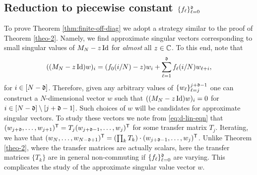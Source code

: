 \documentclass{amsart}
\numberwithin{equation}{section}
\def\corABrev{\textcolor{black}}
\newcommand{\abbr}[1]{{\sc\lowercase{#1}}}
\begin{document}



\subsection{Reduction to piecewise constant $\{f_\ell\}_{\ell=0}^{\mathfrak{d}}$}
To prove Theorem \ref{thm:finite-off-diag} we adopt a strategy similar
to the proof of Theorem \ref{theo-2}. Namely, we find approximate singular vectors corresponding to small singular values of $M_N - z \operatorname{Id}$ for {\em almost} all $z \in \mathbb{C}$. To this end, note that
\begin{equation}\label{eq:d-lin-eqn}
((M_N-z\Id) w)_i = (\corABrev{f_0(i/N)}-z) w_i + \sum_{\ell=1}^{\gd} \corABrev{f_\ell(i/N)} w_{\ell+i},
\end{equation}
for $i \in [N-\mathfrak{d}]$.
Therefore, given any arbitrary values of
$\{w_\ell\}_{\ell=j}^{j+\mathfrak{d}-1}$ one
can construct a $N$-dimensional vector
$w$ such that $((M_N-z\operatorname{Id}) w)_i = 0$ for $i \in[N-\mathfrak{d}]\setminus[j+\mathfrak{d}-1]$.
Such choices of $w$ will be candidates for approximate singular vectors.
To study these vectors we note from \eqref{eq:d-lin-eqn} that
$(w_{j+\mathfrak{d}}, \ldots,w_{j+1})^{\mathsf{T}}= T_j (w_{j+\mathfrak{d} -1},
\ldots,w_j)^{\mathsf{T}}$ for some transfer matrix $T_j$.
Iterating, we have that
$(w_{N}, \ldots,w_{N-\mathfrak{d}+1})^{\mathsf{T}} =
\left(\prod_k T_k\right) \cdot  (w_{j+\mathfrak{d} -1},
\ldots,w_j)^{\mathsf{T}}$. Unlike Theorem \ref{theo-2},
where the transfer matrices are actually scalars,
here the transfer matrices $\{T_k\}$ are in general non-commuting
if $\{f_\ell\}_{\ell=0}^{\mathfrak{d}}$ are varying. This complicates the study
of the
approximate singular value vector $w$.
\end{document}
